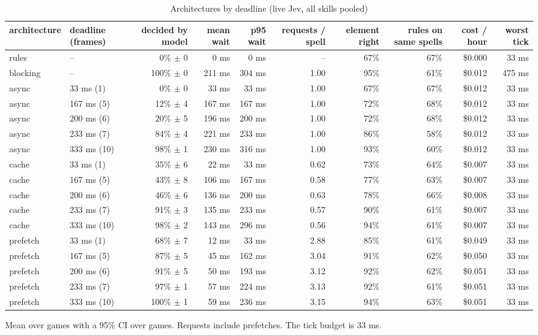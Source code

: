 \begin{table}[ht]
\centering
\small
\caption{Architectures by deadline (live Jev, all skills pooled)}
\label{tab:sweep-main}
\begin{tabular}{llrrrrrrrr}
\toprule
architecture & deadline (frames) & decided by model & mean wait & p95 wait & requests / spell & element right & rules on same spells & cost / hour & worst tick \\
\midrule
rules & -- & 0\% $\pm$ 0 & 0 ms & 0 ms & -- & 67\% & 67\% & \$0.000 & 33 ms \\
blocking & -- & 100\% $\pm$ 0 & 211 ms & 304 ms & 1.00 & 95\% & 61\% & \$0.012 & 475 ms \\
async & 33 ms (1) & 0\% $\pm$ 0 & 33 ms & 33 ms & 1.00 & 67\% & 67\% & \$0.012 & 33 ms \\
async & 167 ms (5) & 12\% $\pm$ 4 & 167 ms & 167 ms & 1.00 & 72\% & 68\% & \$0.012 & 33 ms \\
async & 200 ms (6) & 20\% $\pm$ 5 & 196 ms & 200 ms & 1.00 & 72\% & 68\% & \$0.012 & 33 ms \\
async & 233 ms (7) & 84\% $\pm$ 4 & 221 ms & 233 ms & 1.00 & 86\% & 58\% & \$0.012 & 33 ms \\
async & 333 ms (10) & 98\% $\pm$ 1 & 230 ms & 316 ms & 1.00 & 93\% & 60\% & \$0.012 & 33 ms \\
cache & 33 ms (1) & 35\% $\pm$ 6 & 22 ms & 33 ms & 0.62 & 73\% & 64\% & \$0.007 & 33 ms \\
cache & 167 ms (5) & 43\% $\pm$ 8 & 106 ms & 167 ms & 0.58 & 77\% & 63\% & \$0.007 & 33 ms \\
cache & 200 ms (6) & 46\% $\pm$ 6 & 136 ms & 200 ms & 0.63 & 78\% & 66\% & \$0.008 & 33 ms \\
cache & 233 ms (7) & 91\% $\pm$ 3 & 135 ms & 233 ms & 0.57 & 90\% & 61\% & \$0.007 & 33 ms \\
cache & 333 ms (10) & 98\% $\pm$ 2 & 143 ms & 296 ms & 0.56 & 94\% & 61\% & \$0.007 & 33 ms \\
prefetch & 33 ms (1) & 68\% $\pm$ 7 & 12 ms & 33 ms & 2.88 & 85\% & 61\% & \$0.049 & 33 ms \\
prefetch & 167 ms (5) & 87\% $\pm$ 5 & 45 ms & 162 ms & 3.04 & 91\% & 62\% & \$0.050 & 33 ms \\
prefetch & 200 ms (6) & 91\% $\pm$ 5 & 50 ms & 193 ms & 3.12 & 92\% & 62\% & \$0.051 & 33 ms \\
prefetch & 233 ms (7) & 97\% $\pm$ 1 & 57 ms & 224 ms & 3.13 & 92\% & 61\% & \$0.051 & 33 ms \\
prefetch & 333 ms (10) & 100\% $\pm$ 1 & 59 ms & 236 ms & 3.15 & 94\% & 63\% & \$0.051 & 33 ms \\
\bottomrule
\end{tabular}
\par\smallskip\footnotesize Mean over games with a 95\% CI over games. Requests include prefetches. The tick budget is 33 ms.
\end{table}

